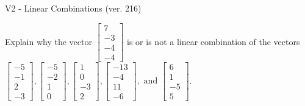 \begin{exercise}
  \begin{exerciseTitle}V2 - Linear Combinations (ver. 216)\end{exerciseTitle}
  \begin{exerciseStatement}
    Explain why the vector \(\left[\begin{array}{c}
7 \\
-3 \\
-4 \\
-4
\end{array}\right]\)  is or is not a linear 
	combination of the vectors \(\left[\begin{array}{c}
-5 \\
-1 \\
2 \\
-3
\end{array}\right] , \left[\begin{array}{c}
-5 \\
-2 \\
1 \\
0
\end{array}\right] , \left[\begin{array}{c}
1 \\
0 \\
-3 \\
2
\end{array}\right] , \left[\begin{array}{c}
-13 \\
-4 \\
11 \\
-6
\end{array}\right] , \text{ and } \left[\begin{array}{c}
6 \\
1 \\
-5 \\
5
\end{array}\right]\).
	



\end{exerciseStatement}
\end{exercise}
